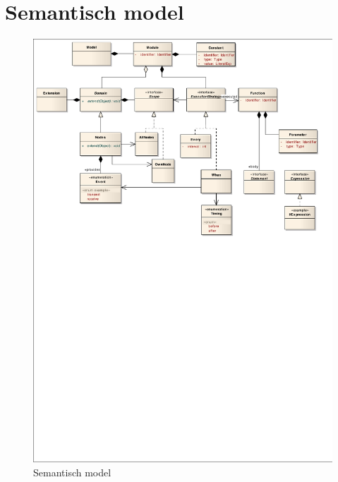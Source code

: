 
\chapter{Semantisch model}
\label{appendix:semantic-model}

\begin{figure}[ht]
  \centering
  \includegraphics[width=\linewidth]{resources/semantic.pdf}
  \caption{Semantisch model}
  \label{fig:arch-semantic-model}
\end{figure}
